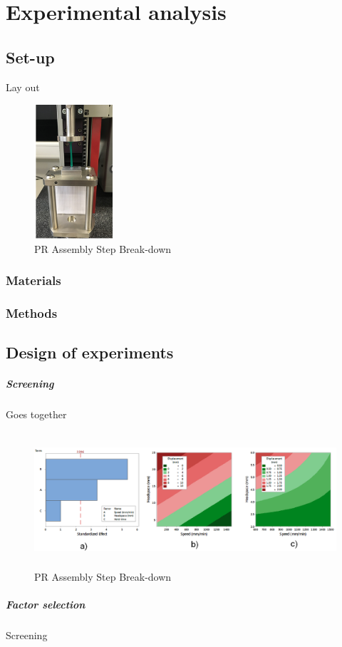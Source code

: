 \newpage
\section{Experimental analysis}
\subsection{Set-up}
Lay out
\begin{figure}[h!]	
	\centering
\includegraphics[height=5cm]{img/setup.PNG}
   \caption{PR Assembly Step Break-down}
 \label{fgr:PFS}
\end{figure}

\subsubsection{Materials}
\subsubsection{Methods}

 
\subsection{Design of experiments}
\subparagraph*{Screening}
Goes together
\begin{figure}[h!]	
	\centering
\includegraphics[height=5cm]{img/screen.PNG}
   \caption{PR Assembly Step Break-down}
 \label{fgr:PFS}
\end{figure} 

\subparagraph*{Factor selection}
Screening

